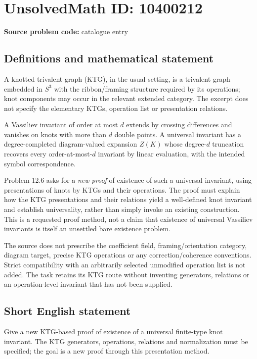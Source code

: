 \documentclass[11pt]{article}
\begin{document}
\section*{UnsolvedMath ID: 10400212}
\textbf{Source problem code:} catalogue entry
\subsection{Definitions and mathematical statement}
A knotted trivalent graph (KTG), in the usual setting, is a trivalent graph embedded in \(S^3\) with the ribbon/framing structure required by its operations; knot components may occur in the relevant extended category. The excerpt does not specify the elementary KTGs, operation list or presentation relations.

A Vassiliev invariant of order at most \(d\) extends by crossing differences and vanishes on knots with more than \(d\) double points. A universal invariant has a degree-completed diagram-valued expansion \(Z(K)\) whose degree-\(d\) truncation recovers every order-at-most-\(d\) invariant by linear evaluation, with the intended symbol correspondence.

Problem 12.6 asks for a \emph{new proof} of existence of such a universal invariant, using presentations of knots by KTGs and their operations. The proof must explain how the KTG presentations and their relations yield a well-defined knot invariant and establish universality, rather than simply invoke an existing construction. This is a requested proof method, not a claim that existence of universal Vassiliev invariants is itself an unsettled bare existence problem.

The source does not prescribe the coefficient field, framing/orientation category, diagram target, precise KTG operations or any correction/coherence conventions. Strict compatibility with an arbitrarily selected unmodified operation list is not added. The task retains its KTG route without inventing generators, relations or an operation-level invariant that has not been supplied.
\subsection{Short English statement}
Give a new KTG-based proof of existence of a universal finite-type knot invariant. The KTG generators, operations, relations and normalization must be specified; the goal is a new proof through this presentation method.
\end{document}
